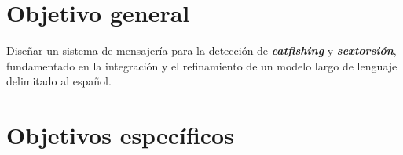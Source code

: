 






\section{Objetivo general}
Diseñar un sistema de mensajería para la detección de \textbf{\textit{catfishing}} y \textbf{\textit{sextorsión}}, fundamentado en la integración y el refinamiento de un modelo largo de lenguaje delimitado al español.





\section{Objetivos específicos}

